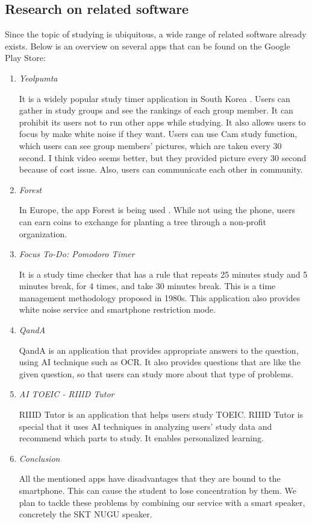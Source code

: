\documentclass[conference]{IEEEtran}
\begin{document}
\subsection{Research on related software}

Since the topic of studying is ubiquitous, a wide range of related software already exists. Below is an overview on several apps that can be found on the Google Play Store:

\begin{enumerate}
\item \textit{Yeolpumta}

It is a widely popular study timer application in South Korea \cite{b2}. Users can gather in study groups and see the rankings of each group member. It can prohibit its users not to run other apps while studying. It also allows users to focus by make white noise if they want. Users can use Cam study function, which users can see group members’ pictures, which are taken every 30 second. I think video seems better, but they provided picture every 30 second because of cost issue. Also, users can communicate each other in community.

\item \textit{Forest}

In Europe, the app Forest is being used \cite{b3}. While not using the phone, users can earn coins to exchange for planting a tree through a non-profit organization.

\item \textit{Focus To-Do: Pomodoro Timer}

It is a study time checker that has a rule that repeats 25 minutes study and 5 minutes break, for 4 times, and take 30 minutes break. This is a time management methodology proposed in 1980s. This application also provides white noise service and smartphone restriction mode.

\item \textit{QandA}

QandA is an application that provides appropriate answers to the question, using AI technique such as OCR. It also provides questions that are like the given question, so that users can study more about that type of problems.

\item \textit{AI TOEIC - RIIID Tutor}

RIIID Tutor is an application that helps users study TOEIC. RIIID Tutor is special that it uses AI techniques in analyzing users’ study data and recommend which parts to study. It enables personalized learning. 

\item \textit{Conclusion}

All the mentioned apps have disadvantages that they are bound to the smartphone. This can cause the student to lose concentration by them. We plan to tackle these problems by combining our service with a smart speaker, concretely the SKT NUGU speaker.


\end{enumerate}
\end{document}
